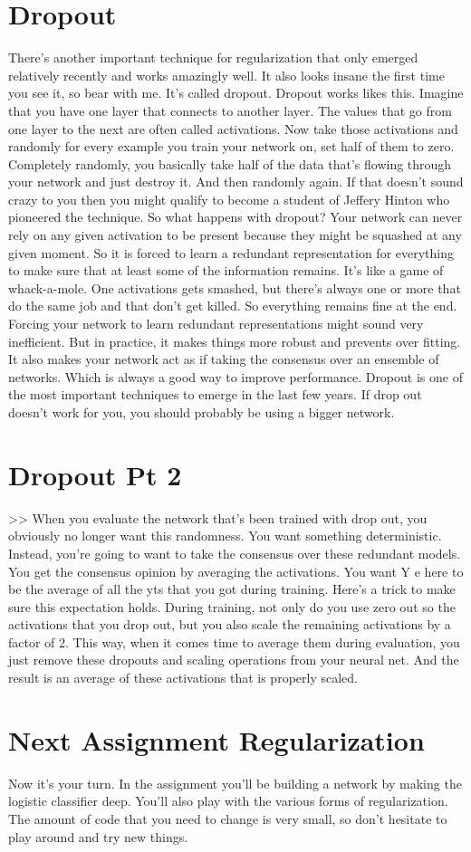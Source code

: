 \documentclass{article}
\begin{document}
\section{Dropout}
There's another important technique for
regularization
that only emerged relatively
recently and works amazingly well.
It also looks insane the first
time you see it, so bear with me.
It's called dropout.
Dropout works likes this.
Imagine that you have one layer
that connects to another layer.
The values that go from one layer to
the next are often called activations.
Now take those activations and
randomly for
every example you train your network on,
set half of them to zero.
Completely randomly, you basically take
half of the data that's flowing through
your network and just destroy it.
And then randomly again.
If that doesn't sound crazy to you then
you might qualify to become a student of
Jeffery Hinton who
pioneered the technique.
So what happens with dropout?
Your network can never rely on any
given activation to be present
because they might be
squashed at any given moment.
So it is forced to learn
a redundant representation for
everything to make sure that at least
some of the information remains.
It's like a game of whack-a-mole.
One activations gets smashed,
but there's always one or
more that do the same job and
that don't get killed.
So everything remains fine at the end.
Forcing your network to learn redundant
representations might sound very
inefficient.
But in practice, it makes things more
robust and prevents over fitting.
It also makes your network act
as if taking the consensus
over an ensemble of networks.
Which is always a good way
to improve performance.
Dropout is one of the most important
techniques to emerge in the last few
years.
If drop out doesn't work for
you, you should probably
be using a bigger network.
\section{Dropout Pt 2}
>> When you evaluate the network
that's been trained with drop out,
you obviously no longer
want this randomness.
You want something deterministic.
Instead, you're going to
want to take the consensus
over these redundant models.
You get the consensus opinion
by averaging the activations.
You want Y e here to be the average
of all the yts that you
got during training.
Here's a trick to make sure
this expectation holds.
During training, not only do you use
zero out so the activations that you
drop out, but you also scale the
remaining activations by a factor of 2.
This way, when it comes time to
average them during evaluation,
you just remove these dropouts and
scaling operations from your neural net.
And the result is an average of these
activations that is properly scaled.
\section{Next Assignment Regularization}
Now it's your turn.
In the assignment you'll be building
a network by making the logistic
classifier deep.
You'll also play with the various
forms of regularization.
The amount of code that you need
to change is very small, so
don't hesitate to play around and
try new things.
\end{document}
